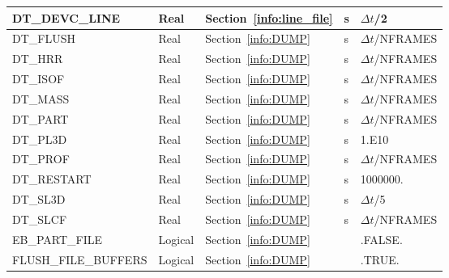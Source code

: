 \documentclass[11pt]{book}
\begin{document}
\begin{longtable}{@{\extracolsep{\fill}}|l|l|l|l|l|}
{\ct DT\_DEVC\_LINE}                & Real         & Section~\ref{info:line_file}           &  s        & $\Delta t${\ct /2}             \\ \hline
{\ct DT\_FLUSH}                     & Real         & Section~\ref{info:DUMP}                &  s        & $\Delta t${\ct /NFRAMES}       \\ \hline
{\ct DT\_HRR}                       & Real         & Section~\ref{info:DUMP}                &  s        & $\Delta t${\ct /NFRAMES}       \\ \hline
{\ct DT\_ISOF}                      & Real         & Section~\ref{info:DUMP}                &  s        & $\Delta t${\ct /NFRAMES}       \\ \hline
{\ct DT\_MASS}                      & Real         & Section~\ref{info:DUMP}                &  s        & $\Delta t${\ct /NFRAMES}       \\ \hline
{\ct DT\_PART}                      & Real         & Section~\ref{info:DUMP}                &  s        & $\Delta t${\ct /NFRAMES}       \\ \hline
{\ct DT\_PL3D}                      & Real         & Section~\ref{info:DUMP}                &  s        & 1.E10                          \\ \hline
{\ct DT\_PROF}                      & Real         & Section~\ref{info:DUMP}                &  s        & $\Delta t${\ct /NFRAMES}       \\ \hline
{\ct DT\_RESTART}                   & Real         & Section~\ref{info:DUMP}                &  s        & 1000000.                       \\ \hline
{\ct DT\_SL3D}                      & Real         & Section~\ref{info:DUMP}                &  s        & $\Delta t${\ct /5}             \\ \hline
{\ct DT\_SLCF}                      & Real         & Section~\ref{info:DUMP}                &  s        & $\Delta t${\ct /NFRAMES}       \\ \hline
{\ct EB\_PART\_FILE}                & Logical      & Section~\ref{info:DUMP}                &           & {\ct .FALSE.}                  \\ \hline
{\ct FLUSH\_FILE\_BUFFERS}          & Logical      & Section~\ref{info:DUMP}                &           & {\ct .TRUE.}                   \\ \hline

\end{longtable}
\end{document}
